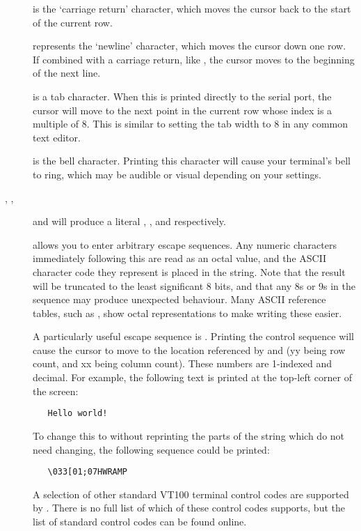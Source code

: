 \begin{description}

\item[] is the `carriage return' character, which moves
the cursor back to the start of the current row.

\item[] represents the `newline' character, which moves the
cursor down one row. If combined with a carriage return, like
, the cursor moves to the beginning of the next line.

\item[] is a tab character. When this is printed directly to
the serial port, the cursor will move to the next point in the current
row whose index is a multiple of 8. This is similar to setting the
tab width to 8 in any common text editor.

\item[] is the bell character. Printing this character
will cause your terminal's bell to ring, which may be audible or visual
depending on your settings.

\item [\src{\textbackslash\textbackslash}, ,] and
 will produce a literal \src{\textbackslash},
, and  respectively.

\item[] allows you to enter arbitrary escape sequences.
Any numeric characters immediately following this are read as an octal value,
and the ASCII character code they represent is placed in the string. Note that
the result will be truncated to the least significant 8 bits, and that any 8s
or 9s in the sequence may produce unexpected behaviour. Many ASCII reference
tables, such as , show octal representations to make writing
these easier.

A particularly useful escape sequence is . Printing
the control sequence \src{"\textbackslash 033[yy;xxH"} will cause the cursor
to move to the location referenced by  and  (yy being row
count, and xx being column count). These numbers are 1-indexed and decimal.
For example, the following text is printed at the top-left corner of the
screen:

\begin{verbatim}
   Hello world!
\end{verbatim}

To change this to  without reprinting the parts of the string
which do not need changing, the following sequence could be printed:

\begin{verbatim}
   \033[01;07HWRAMP
\end{verbatim}

A selection of other standard VT100 terminal control codes are supported by
. There is no full list of which of these control codes
 supports, but the list of standard control codes can be found
online.

\end{description}

